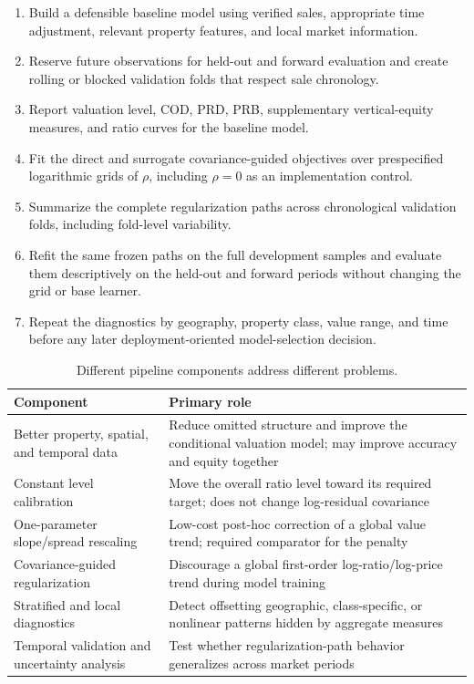 \documentclass[10pt]{article}
\theoremstyle{definition}
\newcommand{\1}{\mathbf{1}}
\begin{document}
\begin{enumerate}[leftmargin=7mm]
    \item Build a defensible baseline model using verified sales, appropriate time adjustment, relevant property features, and local market information.
    \item Reserve future observations for held-out and forward evaluation and create rolling or blocked validation folds that respect sale chronology.
    \item Report valuation level, COD, PRD, PRB, supplementary vertical-equity measures, and ratio curves for the baseline model.
    \item Fit the direct and surrogate covariance-guided objectives over prespecified logarithmic grids of $\rho$, including $\rho=0$ as an implementation control.
    \item Summarize the complete regularization paths across chronological validation folds, including fold-level variability.
    \item Refit the same frozen paths on the full development samples and evaluate them descriptively on the held-out and forward periods without changing the grid or base learner.
    \item Repeat the diagnostics by geography, property class, value range, and time before any later deployment-oriented model-selection decision.
\end{enumerate}

\begin{table}[t]
\centering
\caption{Different pipeline components address different problems.}
\label{tab:roles}
\begin{tabular}{p{4.2cm}p{10.0cm}}
\toprule
Component & Primary role \\
\midrule
Better property, spatial, and temporal data & Reduce omitted structure and improve the conditional valuation model; may improve accuracy and equity together \\
Constant level calibration & Move the overall ratio level toward its required target; does not change log-residual covariance \\
One-parameter slope/spread rescaling & Low-cost post-hoc correction of a global value trend; required comparator for the penalty \\
Covariance-guided regularization & Discourage a global first-order log-ratio/log-price trend during model training \\
Stratified and local diagnostics & Detect offsetting geographic, class-specific, or nonlinear patterns hidden by aggregate measures \\
Temporal validation and uncertainty analysis & Test whether regularization-path behavior generalizes across market periods \\
\bottomrule
\end{tabular}
\end{table}
\end{document}
